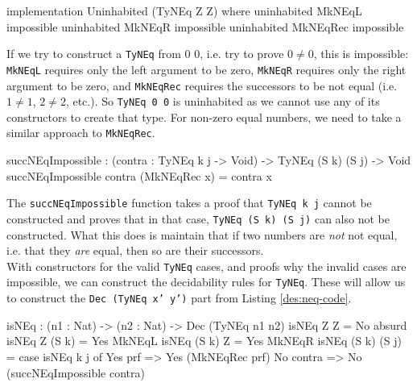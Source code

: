     \begin{code}[label={des:neq-uninh}, caption={Not equals cannot be constructed on 0 0}]
        implementation Uninhabited (TyNEq Z Z) where
            uninhabited MkNEqL   impossible
            uninhabited MkNEqR   impossible
            uninhabited MkNEqRec impossible
    \end{code}

    If we try to construct a \texttt{TyNEq} from 0 0, i.e. try to prove $0 \neq 0$, this is impossible: \texttt{MkNEqL} requires only the left argument to be zero, \texttt{MkNEqR} requires only the right argument to be zero, and \texttt{MkNEqRec} requires the successors to be not equal (i.e. $1 \neq 1$, $2 \neq 2$, etc.). So \texttt{TyNEq 0 0} is uninhabited as we cannot use any of its constructors to create that type. For non-zero equal numbers, we need to take a similar approach to \texttt{MkNEqRec}.
    
    \begin{code}[caption={Proving inequality of numbers is impossible}]
        succNEqImpossible : (contra : TyNEq k j -> Void) ->
                            TyNEq (S k) (S j) -> Void   
        succNEqImpossible contra (MkNEqRec x) = contra x
    \end{code}

    The \texttt{succNEqImpossible} function takes a proof that \texttt{TyNEq k j} cannot be constructed and proves that in that case, \texttt{TyNEq (S k) (S j)} can also not be constructed. What this does is maintain that if two numbers are \textit{not} not equal, i.e. that they \textit{are} equal, then so are their successors.\\
    With constructors for the valid \texttt{TyNEq} cases, and proofs why the invalid cases are impossible, we can construct the decidability rules for \texttt{TyNEq}. These will allow us to construct the \texttt{Dec (TyNEq x' y')} part from Listing \ref{des:neq-code}.
    
    \begin{code}[caption={Decidability rules for \texttt{NEq}}]
isNEq : (n1 : Nat) -> (n2 : Nat) -> Dec (TyNEq n1 n2)
isNEq Z Z         = No absurd
isNEq Z (S k)     = Yes MkNEqL
isNEq (S k) Z     = Yes MkNEqR
isNEq (S k) (S j) = case isNEq k j of
                        Yes prf   => Yes (MkNEqRec prf)
                        No contra => No (succNEqImpossible contra)
    \end{code}
    
